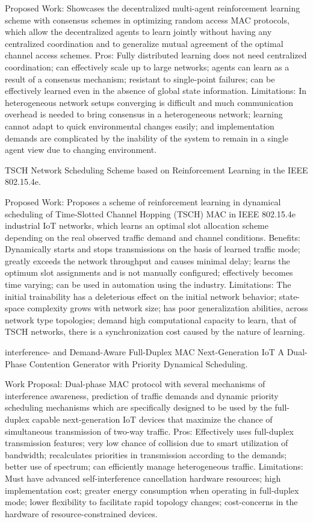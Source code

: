 \documentclass[a4paper,fleqn]{cas-dc}
\numberwithin{equation}{section}
\begin{document}
Proposed Work: Showcases the decentralized multi-agent reinforcement learning scheme with consensus schemes in optimizing random access MAC protocols, which allow the decentralized agents to learn jointly without having any centralized coordination and to generalize mutual agreement of the optimal channel access schemes. Pros: Fully distributed learning does not need centralized coordination; can effectively scale up to large networks; agents can learn as a result of a consensus mechanism; resistant to single-point failures; can be effectively learned even in the absence of global state information. Limitations: In heterogeneous network setups converging is difficult and much communication overhead is needed to bring consensus in a heterogeneous network; learning cannot adapt to quick environmental changes easily; and implementation demands are complicated by the inability of the system to remain in a single agent view due to changing environment.\cite{Oh2025241}


TSCH Network Scheduling Scheme based on Reinforcement Learning in the IEEE 802.15.4e.

Proposed Work: Proposes a scheme of reinforcement learning in dynamical scheduling of Time-Slotted Channel Hopping (TSCH) MAC in IEEE 802.15.4e industrial IoT networks, which learns an optimal slot allocation scheme depending on the real observed traffic demand and channel conditions. Benefits: Dynamically starts and stops transmissions on the basis of learned traffic mode; greatly exceeds the network throughput and causes minimal delay; learns the optimum slot assignments and is not manually configured; effectively becomes time varying; can be used in automation using the industry. Limitations: The initial trainability has a deleterious effect on the initial network behavior; state-space complexity grows with network size; has poor generalization abilities, across network type topologies; demand high computational capacity to learn, that of TSCH networks, there is a synchronization cost caused by the nature of learning.\cite{Zerguine202527060}


interference- and Demand-Aware Full-Duplex MAC Next-Generation IoT A Dual-Phase Contention Generator with Priority Dynamical Scheduling.

Work Proposal: Dual-phase MAC protocol with several mechanisms of interference awareness, prediction of traffic demands and dynamic priority scheduling mechanisms which are specifically designed to be used by the full-duplex capable next-generation IoT devices that maximize the chance of simultaneous transmission of two-way traffic. Pros: Effectively uses full-duplex transmission features; very low chance of collision due to smart utilization of bandwidth; recalculates priorities in transmission according to the demands; better use of spectrum; can efficiently manage heterogeneous traffic. Limitations: Must have advanced self-interference cancellation hardware resources; high implementation cost; greater energy consumption when operating in full-duplex mode; lower flexibility to facilitate rapid topology changes; cost-concerns in the hardware of resource-constrained devices.\cite{Tian2025}
\end{document}
